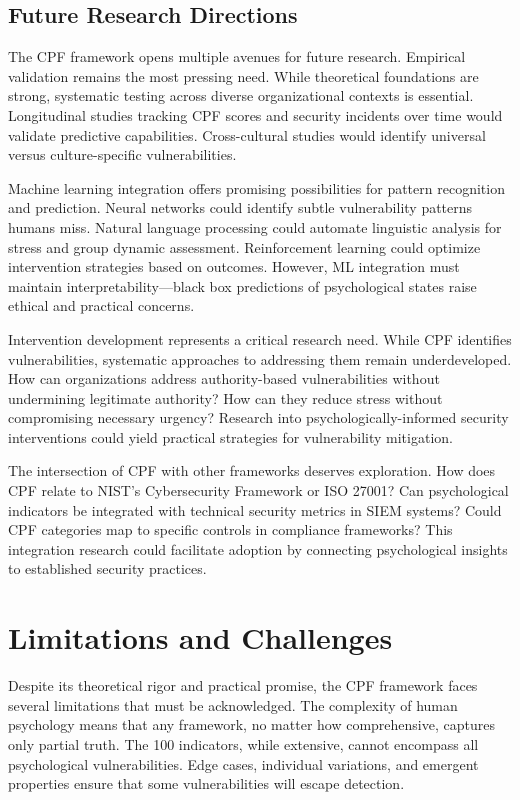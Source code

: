 \documentclass[11pt,a4paper]{article}
\begin{document}
\subsection{Future Research Directions}

The CPF framework opens multiple avenues for future research. Empirical validation remains the most pressing need. While theoretical foundations are strong, systematic testing across diverse organizational contexts is essential. Longitudinal studies tracking CPF scores and security incidents over time would validate predictive capabilities. Cross-cultural studies would identify universal versus culture-specific vulnerabilities.

Machine learning integration offers promising possibilities for pattern recognition and prediction. Neural networks could identify subtle vulnerability patterns humans miss. Natural language processing could automate linguistic analysis for stress and group dynamic assessment. Reinforcement learning could optimize intervention strategies based on outcomes. However, ML integration must maintain interpretability—black box predictions of psychological states raise ethical and practical concerns.

Intervention development represents a critical research need. While CPF identifies vulnerabilities, systematic approaches to addressing them remain underdeveloped. How can organizations address authority-based vulnerabilities without undermining legitimate authority? How can they reduce stress without compromising necessary urgency? Research into psychologically-informed security interventions could yield practical strategies for vulnerability mitigation.

The intersection of CPF with other frameworks deserves exploration. How does CPF relate to NIST's Cybersecurity Framework or ISO 27001? Can psychological indicators be integrated with technical security metrics in SIEM systems? Could CPF categories map to specific controls in compliance frameworks? This integration research could facilitate adoption by connecting psychological insights to established security practices.

\section{Limitations and Challenges}

Despite its theoretical rigor and practical promise, the CPF framework faces several limitations that must be acknowledged. The complexity of human psychology means that any framework, no matter how comprehensive, captures only partial truth. The 100 indicators, while extensive, cannot encompass all psychological vulnerabilities. Edge cases, individual variations, and emergent properties ensure that some vulnerabilities will escape detection.
\end{document}
